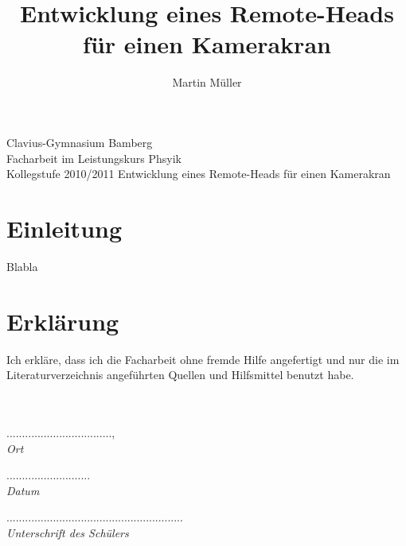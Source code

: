 \documentclass[a4paper, 12pt, bibtotocnumbered, liststotocnumbered]{scrartcl}
\begin{document}
	\title{Entwicklung eines Remote-Heads für einen Kamerakran}
	\author{Martin Müller}

	\begin{center}
		\large{Clavius-Gymnasium Bamberg}\\
		\Large{Facharbeit im Leistungskurs Phsyik}\\
		\large{Kollegstufe 2010/2011}
		\vfill{Entwicklung eines Remote-Heads für einen Kamerakran}
	\end{center}

	\pagebreak

	\tableofcontents

	\pagebreak

	\section{Einleitung}
	Blabla

	\pagebreak

	\nocite{*}
	
	

	\listoffigures

	\pagebreak

	\section*{Erklärung}
	Ich erkläre, dass ich die Facharbeit ohne fremde Hilfe angefertigt und nur die im Literaturverzeichnis angeführten Quellen und Hilfsmittel benutzt habe.
	\\
	\\
	\\
	\begin{minipage}{3cm}
		..................................,\\
		\it{Ort}
	\end{minipage}
	\hspace{1.5cm}
	\begin{minipage}{2cm}
		...........................\\
		\it{Datum}
	\end{minipage}
	\hspace{1.5cm}
	\begin{minipage}{8cm}
		.........................................................\\
		\it{Unterschrift des Schülers}
	\end{minipage}
\end{document}
